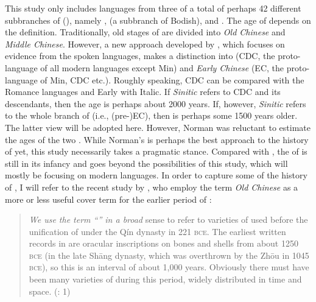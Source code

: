 This study only includes languages from three of a total of perhaps 42 different subbranches of  (\citealt{vanDriem2014}), namely ,  (a subbranch of Bodish), and . The age of \textit{} depends on the definition. Traditionally, old stages of  are divided into \textit{Old Chinese} and \textit{Middle Chinese}. However, a new approach developed by \citet{Norman2014}, which focuses on evidence from the spoken languages, makes a distinction into \textit{} (CDC, the proto-language of all modern  languages except Min) and \textit{Early Chinese} (EC, the proto-language of Min, CDC etc.). Roughly speaking, CDC can be compared with the Romance languages and Early  with Italic. If \textit{Sinitic} refers to CDC and its descendants, then the age is perhaps about 2000 years. If, however, \textit{Sinitic} refers to the whole branch of  (i.e., (pre-)EC), then  is perhaps some 1500 years older. The latter view will be adopted here. However, Norman was reluctant to estimate the ages of the two . While Norman’s is perhaps the best approach to the history of  yet, this study necessarily takes a pragmatic stance. Compared with , the  of  is still in its infancy and goes beyond the possibilities of this study, which will mostly be focusing on modern  languages. In order to capture some of the history of , I will refer to the recent study by \citet{BaxterSagart2014a,BaxterSagart2014b}, who employ the term \textit{Old Chinese} as a more or less useful cover term for the earlier period of :

\begin{quote}
\emph{\textup{We use the term “” in a broad}} sense to refer to varieties of  used before the unification of  under the Qín  dynasty in 221 \textsc{bce}. The earliest written records in  are oracular inscriptions on bones and shells from about 1250 \textsc{bce} (in the late Sh\=ang  dynasty, which was overthrown by the Zh\=ou  in 1045 \textsc{bce}), so this is an interval of about 1,000 years. Obviously there must have been many varieties of  during this period, widely distributed in time and space. (\citealt{BaxterSagart2014a}: 1)
\end{quote}

